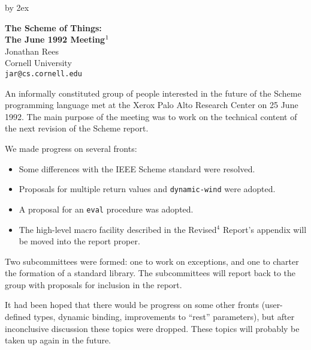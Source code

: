 



\advance \textheight by 2ex



\begin{center}
{\Large\bf The Scheme of Things:} \\
\vspace{2ex}
{\Large\bf The June 1992 Meeting$^{\hbox{\scriptsize 1}}$} \\
\vspace{3ex}
Jonathan Rees \\
Cornell University \\
{\tt jar@cs.cornell.edu}
\end{center}

\vspace{3ex}



An informally constituted group of people interested in the future of
the Scheme programming language met at the Xerox Palo Alto Research
Center on 25 June 1992.  The main purpose of the meeting was to work
on the technical content of the next revision of the Scheme report.

We made progress on several fronts:
\begin{itemize}
\item Some differences with the IEEE Scheme standard were resolved.

\item Proposals for multiple return values and {\tt dynamic-wind} were
adopted.

\item A proposal for an {\tt eval} procedure was adopted.

\item The high-level macro facility described in the 
Revised$^4$ Report's appendix will be moved into the report proper.
\end{itemize}

Two subcommittees were formed: one to work on exceptions, and one to
charter the formation of a standard library.  The subcommittees will
report back to the group with proposals for inclusion in the report.

It had been hoped that there would be progress on some other fronts
(user-defined types, dynamic binding, improvements to ``rest''
parameters), but after inconclusive discussion these topics were
dropped.  These topics will probably be taken up again in the future.

